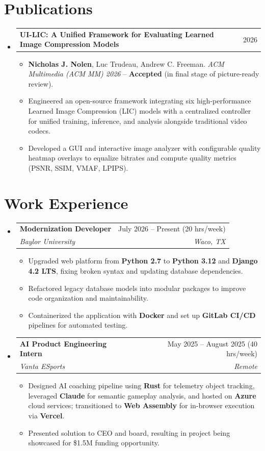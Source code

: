 \documentclass[letterpaper,11pt]{article}
\makeatletter
\newcommand{\resumeItem}[1]{
  \item\small{
    {#1 \vspace{-2pt}}
  }
}
\newcommand{\resumeSubheading}[4]{
  \vspace{-1pt}\item
    \begin{tabular*}{0.97\textwidth}[t]{l@{\extracolsep{\fill}}r}
      \textbf{#1} & #2 \\
      \textit{\small#3} & \textit{\small #4} \\
    \end{tabular*}\vspace{-7pt}
}
\newcommand{\resumeProjectHeading}[2]{
    \vspace{-1pt}\item
    \begin{tabular*}{0.97\textwidth}{l@{\extracolsep{\fill}}r}
      \small#1 & #2 \\
    \end{tabular*}\vspace{-7pt}
}
\newcommand{\resumeSubHeadingListStart}{\begin{itemize}[leftmargin=0.15in, label={}]}
\newcommand{\resumeSubHeadingListEnd}{\end{itemize}}
\newcommand{\resumeItemListStart}{\begin{itemize}[leftmargin=0.2in]}
\newcommand{\resumeItemListEnd}{\end{itemize}\vspace{-5pt}}
\makeatother
\begin{document}
\section{Publications}
  \resumeSubHeadingListStart
    \resumeProjectHeading
      {\textbf{UI-LIC: A Unified Framework for Evaluating Learned Image Compression Models}}{2026}
      \resumeItemListStart
        \resumeItem{\textbf{Nicholas J. Nolen}, Luc Trudeau, Andrew C. Freeman. \emph{ACM Multimedia (ACM MM) 2026} -- \textbf{Accepted} (in final stage of picture-ready review).}
        \resumeItem{Engineered an open-source framework integrating six high-performance Learned Image Compression (LIC) models with a centralized controller for unified training, inference, and analysis alongside traditional video codecs.}
        \resumeItem{Developed a GUI and interactive image analyzer with configurable quality heatmap overlays to equalize bitrates and compute quality metrics (PSNR, SSIM, VMAF, LPIPS).}
      \resumeItemListEnd
  \resumeSubHeadingListEnd

\section{Work Experience}
  \resumeSubHeadingListStart
    \resumeSubheading
      {Modernization Developer}{July 2026 -- Present (20 hrs/week)}
      {Baylor University}{Waco, TX}
      \resumeItemListStart
        \resumeItem{Upgraded web platform from \textbf{Python 2.7} to \textbf{Python 3.12} and \textbf{Django 4.2 LTS}, fixing broken syntax and updating database dependencies.}
        \resumeItem{Refactored legacy database models into modular packages to improve code organization and maintainability.}
        \resumeItem{Containerized the application with \textbf{Docker} and set up \textbf{GitLab CI/CD} pipelines for automated testing.}
      \resumeItemListEnd
    \resumeSubheading
      {AI Product Engineering Intern}{May 2025 -- August 2025 (40 hrs/week)}
      {Vanta ESports}{Remote}
      \resumeItemListStart
        \resumeItem{Designed AI coaching pipeline using \textbf{Rust} for telemetry object tracking, leveraged \textbf{Claude} for semantic gameplay analysis, and hosted on \textbf{Azure} cloud services; transitioned to \textbf{Web Assembly} for in-browser execution via \textbf{Vercel}.}
        \resumeItem{Presented solution to CEO and board, resulting in project being showcased for \$1.5M funding opportunity.}
      \resumeItemListEnd
  \resumeSubHeadingListEnd
\end{document}
